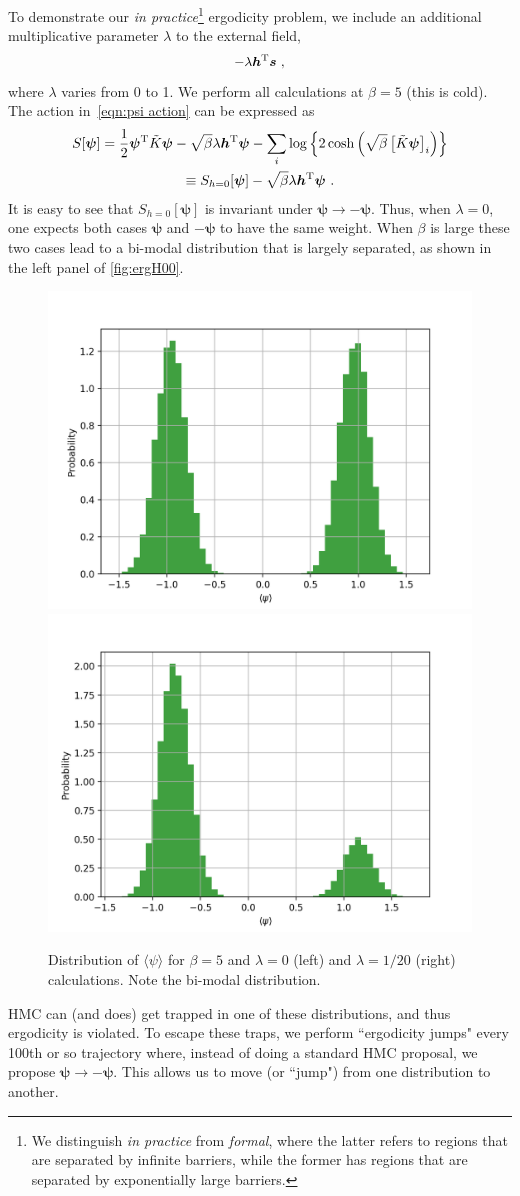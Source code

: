 \documentclass[11pt]{article}
\begin{document}
To demonstrate our \emph{in practice}\footnote{We distinguish \emph{in practice} from \emph{formal}, where the latter refers to regions that are separated by infinite barriers, while the former has regions that are separated by exponentially large barriers.} ergodicity problem, we include an additional multiplicative parameter $\lambda$ to the external field,
\begin{equation}
-\lambda\bm h^{\rm T}\bm s\ ,
\end{equation}
where $\lambda$ varies from 0 to 1.  We perform all calculations at $\beta=5$ (this is cold).  The action in~\eqref{eqn:psi action} can be expressed as
\begin{multline}
S[\bm\psi]=\frac{1}{2}\bm\psi^{\rm T} \tilde K\bm \psi-\sqrt{\beta}\lambda\bm h^{\rm T}\bm\psi-\sum_i\log\left\{2\cosh\left(\sqrt{\beta}\left[\tilde{K}\bm \psi\right]_i\right)\right\}\\
\equiv
S_{h=0}[\bm\psi]-\sqrt{\beta}\lambda\bm h^{\rm T}\bm\psi\ .
\end{multline}
It is easy to see that $S_{h=0}[\bm\psi]$ is invariant under $\bm \psi\to -\bm \psi$.  Thus, when $\lambda=0$, one expects both cases $\bm \psi$ and $-\bm\psi$ to have the same weight.  When $\beta$ is large these two cases lead to a bi-modal distribution that is largely separated, as shown in the left panel of \autoref{fig:ergH00}.
\begin{figure}
\center
\includegraphics[width=.5\columnwidth]{figures/ergH00.png}\includegraphics[width=.5\columnwidth]{figures/ergH05.png}
\caption{Distribution of $\langle \psi\rangle$ for $\beta=5$ and $\lambda=0$ (left) and $\lambda=1/20$ (right) calculations.  Note the bi-modal distribution.\label{fig:ergH00}}
\end{figure}
HMC can (and does) get trapped in one of these distributions, and thus ergodicity is violated.  To escape these traps, we perform ``ergodicity jumps" every 100th or so trajectory where, instead of doing a standard HMC proposal, we propose $\bm\psi\to -\bm \psi$.  This allows us to move (or ``jump") from one distribution to another.
\end{document}
